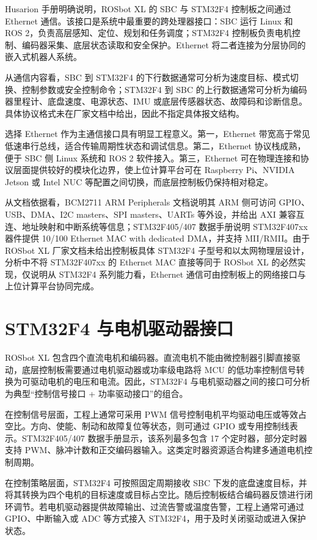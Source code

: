 \documentclass[UTF8,a4paper,12pt]{ctexrep}
\begin{document}
Husarion 手册明确说明，ROSbot XL 的 SBC 与 STM32F4 控制板之间通过 Ethernet 通信。该接口是系统中最重要的跨处理器接口：SBC 运行 Linux 和 ROS 2，负责高层感知、定位、规划和任务调度；STM32F4 控制板负责电机控制、编码器采集、底层状态读取和安全保护。Ethernet 将二者连接为分层协同的嵌入式机器人系统。

从通信内容看，SBC 到 STM32F4 的下行数据通常可分析为速度目标、模式切换、控制参数或安全控制命令；STM32F4 到 SBC 的上行数据通常可分析为编码器里程计、底盘速度、电源状态、IMU 或底层传感器状态、故障码和诊断信息。具体协议格式未在厂家文档中给出，因此不指定具体报文结构。

选择 Ethernet 作为主通信接口具有明显工程意义。第一，Ethernet 带宽高于常见低速串行总线，适合传输周期性状态和调试信息。第二，Ethernet 协议栈成熟，便于 SBC 侧 Linux 系统和 ROS 2 软件接入。第三，Ethernet 可在物理连接和协议层面提供较好的模块化边界，使上位计算平台可在 Raspberry Pi、NVIDIA Jetson 或 Intel NUC 等配置之间切换，而底层控制板仍保持相对稳定。

从文档依据看，BCM2711 ARM Peripherals 文档说明其 ARM 侧可访问 GPIO、USB、DMA、I2C masters、SPI masters、UARTs 等外设，并给出 AXI 兼容互连、地址映射和中断系统等信息；STM32F405/407 数据手册说明 STM32F407xx 器件提供 10/100 Ethernet MAC with dedicated DMA，并支持 MII/RMII。由于 ROSbot XL 厂家文档未给出控制板具体 STM32F4 子型号和以太网物理层设计，分析中不将 STM32F407xx 的 Ethernet MAC 直接等同于 ROSbot XL 的必然实现，仅说明从 STM32F4 系列能力看，Ethernet 通信可由控制板上的网络接口与上位计算平台协同完成。

\section{STM32F4 与电机驱动器接口}

ROSbot XL 包含四个直流电机和编码器。直流电机不能由微控制器引脚直接驱动，底层控制板需要通过电机驱动器或功率级电路将 MCU 的低功率控制信号转换为可驱动电机的电压和电流。因此，STM32F4 与电机驱动器之间的接口可分析为典型“控制信号接口 + 功率驱动接口”的组合。

在控制信号层面，工程上通常可采用 PWM 信号控制电机平均驱动电压或等效占空比。方向、使能、制动和故障复位等状态，则可通过 GPIO 或专用控制线表示。STM32F405/407 数据手册显示，该系列最多包含 17 个定时器，部分定时器支持 PWM、脉冲计数和正交编码器输入。这类定时器资源适合构建多通道电机控制周期。

在控制策略层面，STM32F4 可按照固定周期接收 SBC 下发的底盘速度目标，并将其转换为四个电机的目标速度或目标占空比。随后控制板结合编码器反馈进行闭环调节。若电机驱动器提供故障输出、过流告警或温度告警，工程上通常可通过 GPIO、中断输入或 ADC 等方式接入 STM32F4，用于及时关闭驱动或进入保护状态。
\end{document}
